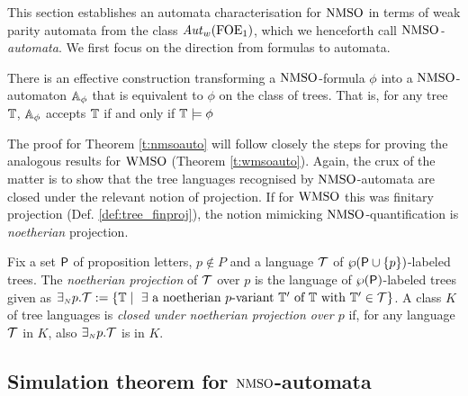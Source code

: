This section establishes an automata characterisation for $\mathrm{NMSO}$ in terms of weak parity automata from the class $\mathit{Aut}_{w}(\mathrm{FOE}_1)$, which we henceforth call \emph{$\mathrm{NMSO}$-automata}. We first focus on the direction from formulas to automata.

\begin{theorem}
\label{t:nmsoauto}
There is an effective construction transforming a $\mathrm{NMSO}$-formula $\phi$
into a $\mathrm{NMSO}$-automaton $\mathbb{A}_{\phi}$ that is equivalent
to $\phi$ on the class of trees.
That is, for any tree $\mathbb{T}$, $\mathbb{A}_{\phi}$ accepts $\mathbb{T}$ if and only if $\mathbb{T} \models {\phi}$
\end{theorem}

The proof for Theorem \ref{t:nmsoauto} will follow closely the steps for proving the analogous results for $\mathrm{WMSO}$ (Theorem \ref{t:wmsoauto}). Again, the crux of the matter is to show that the tree languages recognised by $\mathrm{NMSO}$-automata are closed under the relevant notion of projection. If for $\mathrm{WMSO}$ this was finitary projection (Def. \ref{def:tree_finproj}), the notion mimicking $\mathrm{NMSO}$-quantification is \emph{noetherian} projection.

\begin{definition}\label{def:tree_finproj}
Fix a set $\mathsf{P}$ of proposition letters, $p \not\in P$ and a language $\mathcal{T}$ of $\wp (\mathsf{P}\cup\{p\})$-labeled
trees.
The \emph{noetherian projection} of $\mathcal{T}$ over $p$ is the language of $\wp (\mathsf{P})$-labeled trees given as $\noetexists p.\trees \df \{\bbT \mid \text{ $\exists$ a noetherian $p$-variant } \bbT' \text{ of } \bbT \text{ with } \bbT' \in \trees\}$. A class $K$ of tree languages is \emph{closed under noetherian projection over $p$} if, for any language $\mathcal{T}$ in $K$, also ${\exists_{{\scriptscriptstyle N}} p}.\mathcal{T}$ is in $K$.
\end{definition} 

\subsection{Simulation theorem for $\mathrm{NMSO}$-automata}\label{sec:simulation_nmso}

